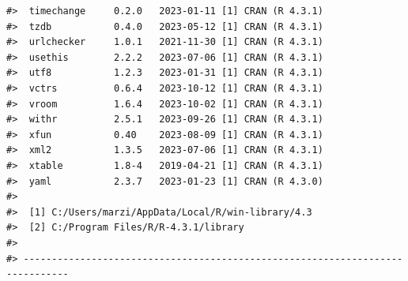 \documentclass[
  letterpaper,
  DIV=11,
  numbers=noendperiod]{scrreport}
\begin{document}
\begin{verbatim}
#>  timechange     0.2.0   2023-01-11 [1] CRAN (R 4.3.1)
#>  tzdb           0.4.0   2023-05-12 [1] CRAN (R 4.3.1)
#>  urlchecker     1.0.1   2021-11-30 [1] CRAN (R 4.3.1)
#>  usethis        2.2.2   2023-07-06 [1] CRAN (R 4.3.1)
#>  utf8           1.2.3   2023-01-31 [1] CRAN (R 4.3.1)
#>  vctrs          0.6.4   2023-10-12 [1] CRAN (R 4.3.1)
#>  vroom          1.6.4   2023-10-02 [1] CRAN (R 4.3.1)
#>  withr          2.5.1   2023-09-26 [1] CRAN (R 4.3.1)
#>  xfun           0.40    2023-08-09 [1] CRAN (R 4.3.1)
#>  xml2           1.3.5   2023-07-06 [1] CRAN (R 4.3.1)
#>  xtable         1.8-4   2019-04-21 [1] CRAN (R 4.3.1)
#>  yaml           2.3.7   2023-01-23 [1] CRAN (R 4.3.0)
#> 
#>  [1] C:/Users/marzi/AppData/Local/R/win-library/4.3
#>  [2] C:/Program Files/R/R-4.3.1/library
#> 
#> ------------------------------------------------------------------------------
\end{verbatim}
\end{document}
